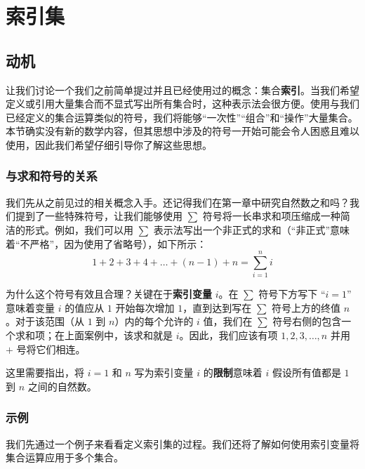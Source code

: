 \section{索引集}

\subsection{动机}

让我们讨论一个我们之前简单提过并且已经使用过的概念：集合\textbf{索引}。当我们希望定义或引用大量集合而不显式写出所有集合时，这种表示法会很方便。使用与我们已经定义的集合运算类似的符号，我们将能够``一次性''``组合''和``操作''大量集合。本节确实没有新的数学内容，但其思想中涉及的符号一开始可能会令人困惑且难以使用，因此我们希望仔细引导你了解这些思想。

\subsubsection*{与求和符号的关系}

我们先从之前见过的相关概念入手。还记得我们在第一章中研究自然数之和吗？我们提到了一些特殊符号，让我们能够使用 $\sum$ 符号将一长串求和项压缩成一种简洁的形式。例如，我们可以用 $\sum$ 表示法写出一个非正式的求和（``非正式''意味着``不严格''，因为使用了省略号），如下所示：
\[1 + 2 + 3 + 4 + \dots + (n - 1) + n = \sum_{i=1}^{n} i\]

为什么这个符号有效且合理？关键在于\textbf{索引变量} $i$。在 $\sum$ 符号下方写下 ``$i = 1$'' 意味着变量 $i$ 的值应从 $1$ 开始每次增加 $1$，直到达到写在 $\sum$ 符号上方的终值 $n$。对于该范围（从 $1$ 到 $n$）内的每个允许的 $i$ 值，我们在 $\sum$ 符号右侧的包含一个求和项；在上面案例中，该求和就是 $i$。因此，我们应该有项 $1, 2, 3,\dots, n$ 并用 $+$ 号将它们相连。

这里需要指出，将 $i = 1$ 和 $n$ 写为索引变量 $i$ 的\textbf{限制}意味着 $i$ 假设所有值都是 $1$ 到 $n$ 之间的自然数。

\subsubsection*{示例}

我们先通过一个例子来看看定义索引集的过程。我们还将了解如何使用索引变量将集合运算应用于多个集合。

